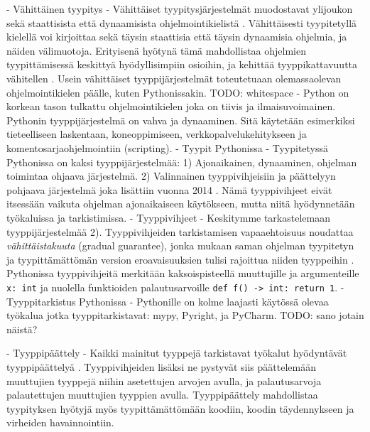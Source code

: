 \begin{otherlanguage}{finnish}
    - Vähittäinen tyypitys
        - Vähittäiset tyypitysjärjestelmät muodostavat ylijoukon sekä staattisista että dynaamisista ohjelmointikielistä \cite{siek_refined_gradual_2015}. Vähittäisesti tyypitetyllä kielellä voi kirjoittaa sekä täysin staattisia että täysin dynaamisia ohjelmia, ja näiden välimuotoja. Erityisenä hyötynä tämä mahdollistaa ohjelmien tyypittämisessä keskittyä hyödyllisimpiin osioihin, ja kehittää tyyppikattavuutta vähitellen \cite{siek_refined_gradual_2015}. Usein vähittäiset tyyppijärjestelmät toteutetuaan olemassaolevan ohjelmointikielen päälle, kuten Pythonissakin.
        TODO: whitespace
    - Python on korkean tason tulkattu ohjelmointikielen joka on tiivis ja ilmaisuvoimainen. Pythonin tyyppijärjestelmä on vahva ja dynaaminen. Sitä käytetään esimerkiksi tieteelliseen laskentaan, koneoppimiseen, verkkopalvelukehitykseen ja komentosarjaohjelmointiin (scripting).
    - Tyypit Pythonissa
        - Tyypitetyssä Pythonissa on kaksi tyyppijärjestelmää: 1) Ajonaikainen, dynaaminen, ohjelman toimintaa ohjaava järjestelmä. 2) Valinnainen tyyppivihjeisiin ja päättelyyn pohjaava järjestelmä joka lisättiin vuonna 2014 \cite{pep_484}. Nämä tyyppivihjeet eivät itsessään vaikuta ohjelman ajonaikaiseen käytökseen, mutta niitä hyödynnetään työkaluissa ja tarkistimissa.
    - Tyyppivihjeet
        - Keskitymme tarkastelemaan tyyppijärjestelmää 2). Tyyppivihjeiden tarkistamisen vapaaehtoisuus noudattaa \emph{vähittäistakuuta} (gradual guarantee), jonka mukaan saman ohjelman tyypitetyn ja tyypittämättömän version eroavaisuuksien tulisi rajoittua niiden tyyppeihin \cite{siek_refined_gradual_2015}. Pythonissa tyyppivihjeitä merkitään kaksoispisteellä muuttujille ja argumenteille {\tt x: int} ja nuolella funktioiden palautusarvoille {\tt def f() -> int: return 1}.
    - Tyyppitarkistus Pythonissa
        - Pythonille on kolme laajasti käytössä olevaa työkalua jotka tyyppitarkistavat: mypy, Pyright, ja PyCharm.
        TODO: sano jotain näistä?

    - Tyyppipäättely
        - Kaikki mainitut tyyppejä tarkistavat työkalut hyödyntävät tyyppipäättelyä \cite{jetbrains_type_hinting_pycharm, mypy_type_inference, pyright_type_inference}. Tyyppivihjeiden lisäksi ne pystyvät siis päättelemään muuttujien tyyppejä niihin asetettujen arvojen avulla, ja palautusarvoja palautettujen muuttujien tyyppien avulla. Tyyppipäättely mahdollistaa tyypityksen hyötyjä myös tyypittämättömään koodiin, koodin täydennykseen ja virheiden havainnointiin.


\end{otherlanguage}
